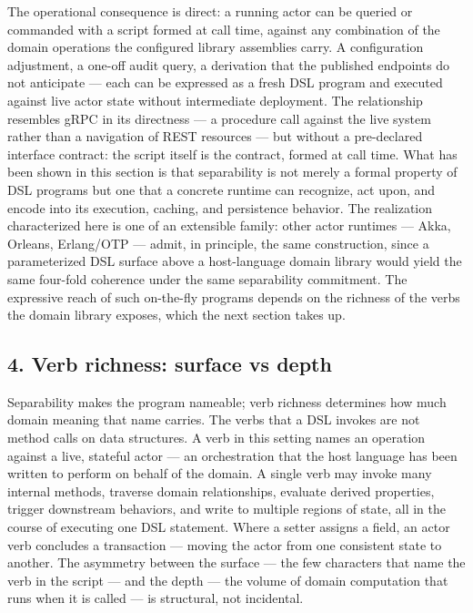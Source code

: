 \documentclass[
]{article}
\begin{document}
The operational consequence is direct: a running actor can be queried or
commanded with a script formed at call time, against any combination of
the domain operations the configured library assemblies carry. A
configuration adjustment, a one-off audit query, a derivation that the
published endpoints do not anticipate --- each can be expressed as a
fresh DSL program and executed against live actor state without
intermediate deployment. The relationship resembles gRPC in its
directness --- a procedure call against the live system rather than a
navigation of REST resources --- but without a pre-declared interface
contract: the script itself is the contract, formed at call time. What
has been shown in this section is that separability is not merely a
formal property of DSL programs but one that a concrete runtime can
recognize, act upon, and encode into its execution, caching, and
persistence behavior. The realization characterized here is one of an
extensible family: other actor runtimes --- Akka, Orleans, Erlang/OTP
--- admit, in principle, the same construction, since a parameterized
DSL surface above a host-language domain library would yield the same
four-fold coherence under the same separability commitment. The
expressive reach of such on-the-fly programs depends on the richness of
the verbs the domain library exposes, which the next section takes up.

\subsection{4. Verb richness: surface vs
depth}\label{verb-richness-surface-vs-depth}

Separability makes the program nameable; verb richness determines how
much domain meaning that name carries. The verbs that a DSL invokes are
not method calls on data structures. A verb in this setting names an
operation against a live, stateful actor --- an orchestration that the
host language has been written to perform on behalf of the domain. A
single verb may invoke many internal methods, traverse domain
relationships, evaluate derived properties, trigger downstream
behaviors, and write to multiple regions of state, all in the course of
executing one DSL statement. Where a setter assigns a field, an actor
verb concludes a transaction --- moving the actor from one consistent
state to another. The asymmetry between the surface --- the few
characters that name the verb in the script --- and the depth --- the
volume of domain computation that runs when it is called --- is
structural, not incidental.
\end{document}
